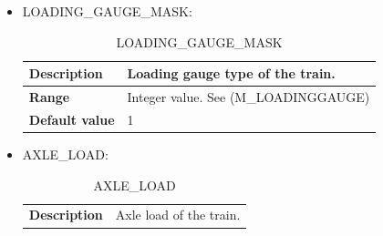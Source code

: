 \begin{itemize}
\begin{longtable}{|l|l|}
				\hline

			\end{longtable}

		\item LOADING\_GAUGE\_MASK:

			\begin{longtable}{|l|l|}
				\caption{LOADING\_GAUGE\_MASK}\\
				\hline

					\begin{minipage}[t]{0.22\linewidth} \textbf{Description}	\end{minipage}
				&	\begin{minipage}[t]{0.78\linewidth} Loading gauge type of the train. \end{minipage} \\

				\hline

					\begin{minipage}[t]{0.22\linewidth} \textbf{Range}	\end{minipage}
				&	\begin{minipage}[t]{0.78\linewidth} Integer value. See (M\_LOADINGGAUGE) \end{minipage} \\

				\hline

					\begin{minipage}[t]{0.22\linewidth} \textbf{Default value}	\end{minipage}
				&	\begin{minipage}[t]{0.78\linewidth} 1 \end{minipage} \\

				\hline

			\end{longtable}

		\item AXLE\_LOAD:

			\begin{longtable}{|l|l|}
				\caption{AXLE\_LOAD}\\
				\hline

					\begin{minipage}[t]{0.22\linewidth} \textbf{Description}	\end{minipage}
				&	\begin{minipage}[t]{0.78\linewidth} Axle load of the train. \end{minipage} \\


\end{longtable}
\end{itemize}
